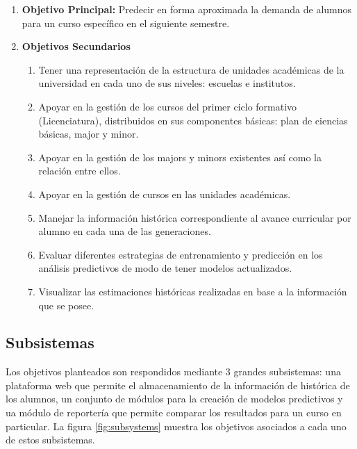 \begin{enumerate}
	\item \textbf{Objetivo Principal:} Predecir en forma aproximada la demanda de alumnos para un curso específico en el siguiente semestre.
	\item \textbf{Objetivos Secundarios}
		\begin{enumerate}
			\item Tener una representación de la estructura de unidades académicas de la universidad en cada uno de sus niveles: escuelas e institutos.
			\item Apoyar en la gestión de los cursos del primer ciclo formativo (Licenciatura),  distribuidos en sus componentes básicas: plan de ciencias básicas, major y minor.
			\item Apoyar en la gestión de los majors y minors existentes así como la relación entre ellos.
			\item Apoyar en la gestión de cursos en las unidades académicas.
			\item Manejar la información histórica correspondiente al avance curricular por alumno en cada una de las generaciones.
			\item Evaluar diferentes estrategias de entrenamiento y predicción en los análisis predictivos de modo de  tener modelos actualizados.
			\item Visualizar las estimaciones históricas realizadas en base a la información que se posee.
		\end{enumerate}
\end{enumerate}

\subsection{Subsistemas \label{sec:sub_systems}}
Los objetivos planteados son respondidos mediante 3 grandes subsistemas:  una plataforma web que permite el almacenamiento de la información de histórica de los alumnos,  un conjunto de módulos para la creación de modelos predictivos y ua módulo de reportería que permite comparar los resultados para un curso en particular. La figura \ref{fig:subsystems} muestra los objetivos asociados a cada uno de estos subsistemas.

